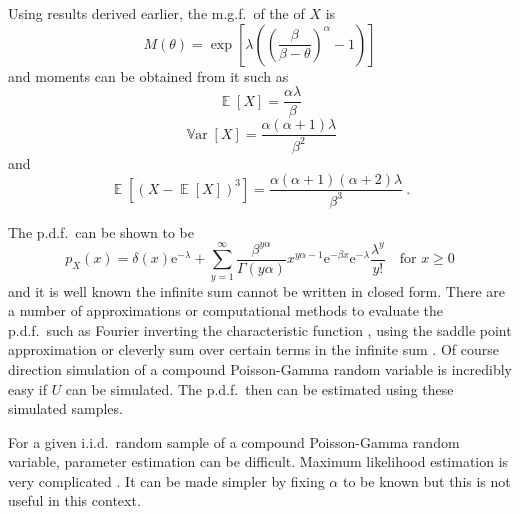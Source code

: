 \documentclass[12pt, a4paper]{memoir}
\DeclareMathOperator{\expectation}{\mathbb{E}}
\DeclareMathOperator{\variance}{\mathbb{V}ar}
\newcommand{\euler}{\mathrm{e}}
\begin{document}
Using results derived earlier, the m.g.f.~of the of $X$ is
\begin{equation}
M(\theta)=\exp\left[\lambda\left(\left(\frac{\beta}{\beta-\theta}\right)^{\alpha}-1\right)\right]
\end{equation}
and moments can be obtained from it such as
\begin{equation}
\expectation\left[X\right]=\frac{\alpha\lambda}{\beta}
\end{equation}
\begin{equation}
\variance\left[X\right]=\frac{\alpha(\alpha+1)\lambda}{\beta^2}
\label{eq:compoundPoisson_variance}
\end{equation}
and
\begin{equation}
\expectation\left[(X-\expectation[X])^3\right] = \frac{\alpha(\alpha+1)(\alpha+2)\lambda}{\beta^3} \ .
\end{equation}

The p.d.f.~can be shown to be
\begin{equation}
p_X(x) = 
\delta(x) \euler^{-\lambda}
+
\sum_{y=1}^{\infty}\frac{\beta^{y\alpha}}{\Gamma(y\alpha)}x^{y\alpha-1}\euler^{-\beta x}\euler^{-\lambda}\frac{\lambda^y}{y!}
\quad\text{for }x\geqslant 0
\label{eq:compoundPoisson_pdf}
\end{equation}
and it is well known the infinite sum cannot be written in closed form. There are a number of approximations or computational methods to evaluate the p.d.f.~such as Fourier inverting the characteristic function \citep{dunn2008evaluation}, using the saddle point approximation \citep{daniels1954saddlepoint} or cleverly sum over certain terms in the infinite sum \citep{dunn2005series}. Of course direction simulation of a compound Poisson-Gamma random variable is incredibly easy if $U$ can be simulated. The p.d.f.~then can be estimated using these simulated samples.

For a given i.i.d.~random sample of a compound Poisson-Gamma random variable, parameter estimation can be difficult. Maximum likelihood estimation is very complicated \citep{withers2011compound}. It can be made simpler by fixing $\alpha$ to be known \citep{withers2011compound} but this is not useful in this context.
\end{document}
